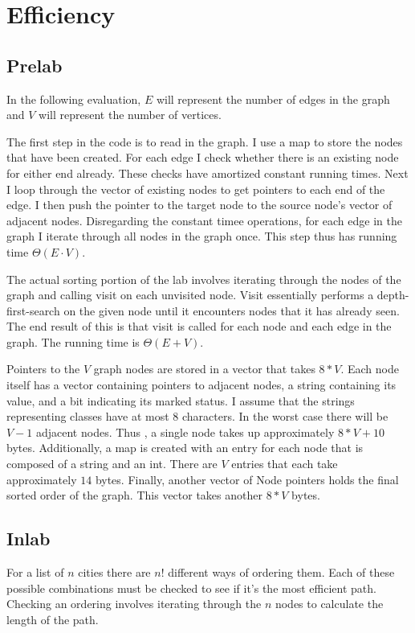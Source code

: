 \documentclass{article}
\begin{document}
\section{Efficiency}
\subsection{Prelab}
In the following evaluation, $E$ will represent the number of edges in the graph and $V$ will represent the number of vertices.

The first step in the code is to read in the graph. I use a map to store the nodes that have been created. For each edge I check whether there is an existing node for either end already. These checks have amortized constant running times. Next I loop through the vector of existing nodes to get pointers to each end of the edge. I then push the pointer to the target node to the source node's vector of adjacent nodes. Disregarding the constant timee operations, for each edge in the graph I iterate through all nodes in the graph once. This step thus has running time $\Theta(E\cdot V)$. 

The actual sorting portion of the lab involves iterating through the nodes of the graph and calling visit on each unvisited node. Visit essentially performs a depth-first-search on the given node until it encounters nodes that it has already seen. The end result of this is that visit is called for each node and each edge in the graph. The running time is $\Theta(E + V)$.

Pointers to the $V$ graph nodes are stored in a vector that takes $8*V$. Each node itself has a vector containing pointers to adjacent nodes, a string containing its value, and a bit indicating its marked status. I assume that the strings representing classes have at most 8 characters. In the worst case there will be $V-1$ adjacent nodes. Thus , a single node takes up approximately $8*V + 10$ bytes. Additionally, a map is created with an entry for each node that is composed of a string and an int. There are $V$ entries that each take approximately $14$ bytes. Finally, another vector of Node pointers holds the final sorted order of the graph. This vector takes another $8*V$ bytes. 

\subsection{Inlab}
For a list of $n$ cities there are $n!$ different ways of ordering them. Each of these possible combinations must be checked to see if it's the most efficient path. Checking an ordering involves iterating through the $n$ nodes to calculate the length of the path.
\end{document}

